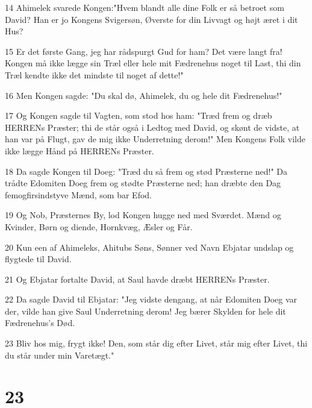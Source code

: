 \par 14 Ahimelek svarede Kongen:"Hvem blandt alle dine Folk er så betroet som David? Han er jo Kongens Svigersøn, Øverste for din Livvagt og højt æret i dit Hus?
\par 15 Er det første Gang, jeg har rådspurgt Gud for ham? Det være langt fra! Kongen må ikke lægge sin Træl eller hele mit Fædrenehus noget til Last, thi din Træl kendte ikke det mindste til noget af dette!"
\par 16 Men Kongen sagde: "Du skal dø, Ahimelek, du og hele dit Fædrenehus!"
\par 17 Og Kongen sagde til Vagten, som stod hos ham: "Træd frem og dræb HERRENs Præster; thi de står også i Ledtog med David, og skønt de vidste, at han var på Flugt, gav de mig ikke Underretning derom!" Men Kongens Folk vilde ikke lægge Hånd på HERRENs Præster.
\par 18 Da sagde Kongen til Doeg: "Træd du så frem og stød Præsterne ned!" Da trådte Edomiten Doeg frem og stødte Præsterne ned; han dræbte den Dag femogfirsindstyve Mænd, som bar Efod.
\par 19 Og Nob, Præsternes By, lod Kongen hugge ned med Sværdet. Mænd og Kvinder, Børn og diende, Hornkvæg, Æsler og Får.
\par 20 Kun een af Ahimeleks, Ahitubs Søns, Sønner ved Navn Ebjatar undslap og flygtede til David.
\par 21 Og Ebjatar fortalte David, at Saul havde dræbt HERRENs Præster.
\par 22 Da sagde David til Ebjatar: "Jeg vidste dengang, at når Edomiten Doeg var der, vilde han give Saul Underretning derom! Jeg bærer Skylden for hele dit Fædrenehus's Død.
\par 23 Bliv hos mig, frygt ikke! Den, som står dig efter Livet, står mig efter Livet, thi du står under min Varetægt."

\chapter{23}


